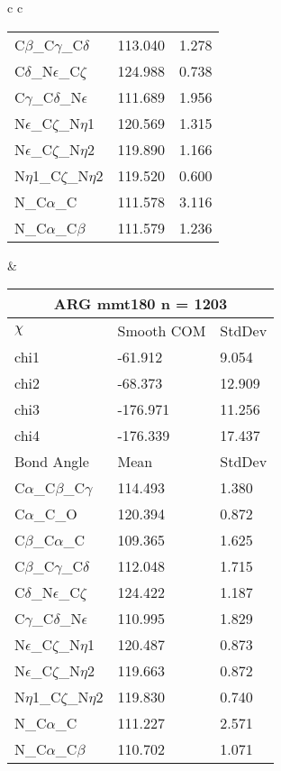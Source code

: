 \begin{longtable}{ c c }
\begin{tabular}{ l l l }
  C$\beta$\_C$\gamma$\_C$\delta$ & 113.040 & 1.278\\
  C$\delta$\_N$\epsilon$\_C$\zeta$ & 124.988 & 0.738\\
  C$\gamma$\_C$\delta$\_N$\epsilon$ & 111.689 & 1.956\\
  N$\epsilon$\_C$\zeta$\_N$\eta$1 & 120.569 & 1.315\\
  N$\epsilon$\_C$\zeta$\_N$\eta$2 & 119.890 & 1.166\\
  N$\eta$1\_C$\zeta$\_N$\eta$2 & 119.520 & 0.600\\
  N\_C$\alpha$\_C & 111.578 & 3.116\\
  N\_C$\alpha$\_C$\beta$ & 111.579 & 1.236\\
  \bottomrule
  \end{tabular}
  &
  \begin{tabular}{ l l l }
  \toprule
  \multicolumn{3}{c}{ARG \textbf{mmt180} n = 1203} \\ \toprule
  $\chi$       & Smooth COM & StdDev \\ \midrule
  chi1 & -61.912 & 9.054 \\ 
  chi2 & -68.373 & 12.909 \\ 
  chi3 & -176.971 & 11.256 \\ 
  chi4 & -176.339 & 17.437 \\ \midrule
  Bond Angle   & Mean     & StdDev \\ \midrule
  C$\alpha$\_C$\beta$\_C$\gamma$ & 114.493 & 1.380\\
  C$\alpha$\_C\_O & 120.394 & 0.872\\
  C$\beta$\_C$\alpha$\_C & 109.365 & 1.625\\
  C$\beta$\_C$\gamma$\_C$\delta$ & 112.048 & 1.715\\
  C$\delta$\_N$\epsilon$\_C$\zeta$ & 124.422 & 1.187\\
  C$\gamma$\_C$\delta$\_N$\epsilon$ & 110.995 & 1.829\\
  N$\epsilon$\_C$\zeta$\_N$\eta$1 & 120.487 & 0.873\\
  N$\epsilon$\_C$\zeta$\_N$\eta$2 & 119.663 & 0.872\\
  N$\eta$1\_C$\zeta$\_N$\eta$2 & 119.830 & 0.740\\
  N\_C$\alpha$\_C & 111.227 & 2.571\\
  N\_C$\alpha$\_C$\beta$ & 110.702 & 1.071\\
  \bottomrule
  \end{tabular}
  \\
  \begin{tabular}{ l l l }

\end{tabular}
\end{longtable}
